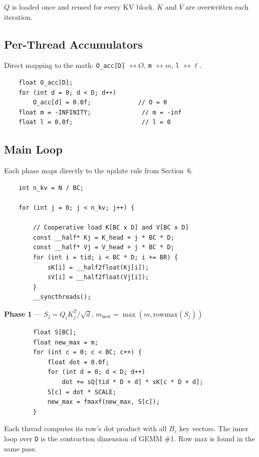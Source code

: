 \documentclass[11pt, letterpaper]{article}
\begin{document}
$Q$ is loaded once and reused for every KV block. $K$ and $V$ are overwritten each iteration.

\subsection{Per-Thread Accumulators}

Direct mapping to the math: \texttt{O\_acc[D]} $\leftrightarrow O$, \quad \texttt{m} $\leftrightarrow m$, \quad \texttt{l} $\leftrightarrow \ell$.

\begin{lstlisting}
    float O_acc[D];
    for (int d = 0; d < D; d++)
        O_acc[d] = 0.0f;             // O = 0
    float m = -INFINITY;              // m = -inf
    float l = 0.0f;                   // l = 0
\end{lstlisting}

\subsection{Main Loop}

Each phase maps directly to the update rule from Section~6.

\begin{lstlisting}
    int n_kv = N / BC;

    for (int j = 0; j < n_kv; j++) {

        // Cooperative load K[BC x D] and V[BC x D]
        const __half* Kj = K_head + j * BC * D;
        const __half* Vj = V_head + j * BC * D;
        for (int i = tid; i < BC * D; i += BR) {
            sK[i] = __half2float(Kj[i]);
            sV[i] = __half2float(Vj[i]);
        }
        __syncthreads();
\end{lstlisting}

\medskip
\noindent\textbf{Phase 1} --- $S_j = Q_i K_j^T / \sqrt{d}$, \; $m_{\text{new}} = \max(m, \text{rowmax}(S_j))$

\begin{lstlisting}
        float S[BC];
        float new_max = m;
        for (int c = 0; c < BC; c++) {
            float dot = 0.0f;
            for (int d = 0; d < D; d++)
                dot += sQ[tid * D + d] * sK[c * D + d];
            S[c] = dot * SCALE;
            new_max = fmaxf(new_max, S[c]);
        }
\end{lstlisting}

Each thread computes its row's dot product with all $B_c$ key vectors. The inner loop over \texttt{D} is the contraction dimension of GEMM \#1. Row max is found in the same pass.
\end{document}

